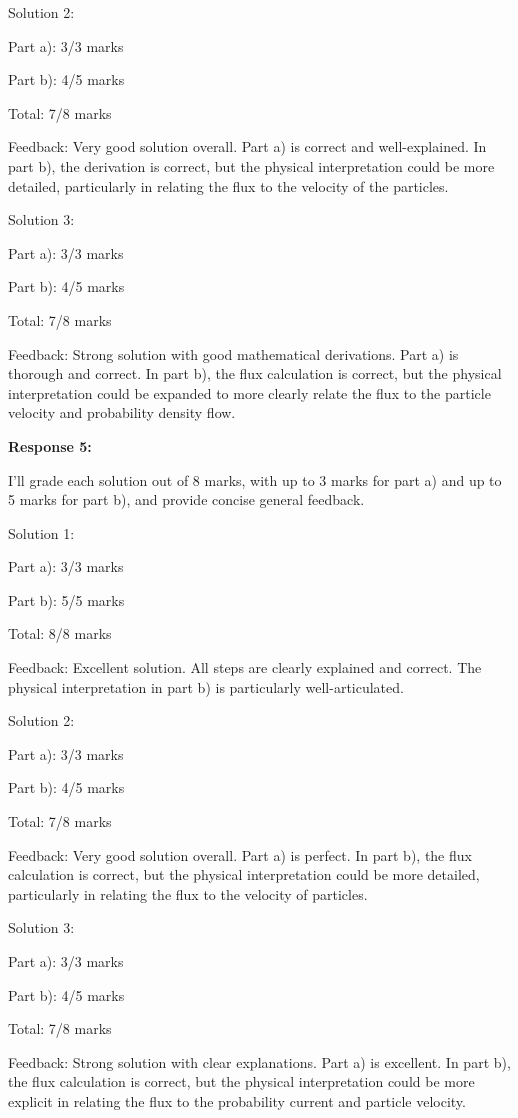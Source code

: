 \documentclass[a4paper,11pt]{article}
\begin{document}
Solution 2:

Part a): 3/3 marks

Part b): 4/5 marks

Total: 7/8 marks

Feedback: Very good solution overall. Part a) is correct and well-explained. In part b), the derivation is correct, but the physical interpretation could be more detailed, particularly in relating the flux to the velocity of the particles.

Solution 3:

Part a): 3/3 marks

Part b): 4/5 marks

Total: 7/8 marks

Feedback: Strong solution with good mathematical derivations. Part a) is thorough and correct. In part b), the flux calculation is correct, but the physical interpretation could be expanded to more clearly relate the flux to the particle velocity and probability density flow.

\bigskip   
\textbf{Response 5:}

I'll grade each solution out of 8 marks, with up to 3 marks for part a) and up to 5 marks for part b), and provide concise general feedback.

Solution 1:

Part a): 3/3 marks

Part b): 5/5 marks

Total: 8/8 marks

Feedback: Excellent solution. All steps are clearly explained and correct. The physical interpretation in part b) is particularly well-articulated.

Solution 2:

Part a): 3/3 marks

Part b): 4/5 marks

Total: 7/8 marks

Feedback: Very good solution overall. Part a) is perfect. In part b), the flux calculation is correct, but the physical interpretation could be more detailed, particularly in relating the flux to the velocity of particles.

Solution 3:

Part a): 3/3 marks

Part b): 4/5 marks

Total: 7/8 marks

Feedback: Strong solution with clear explanations. Part a) is excellent. In part b), the flux calculation is correct, but the physical interpretation could be more explicit in relating the flux to the probability current and particle velocity.
\end{document}
